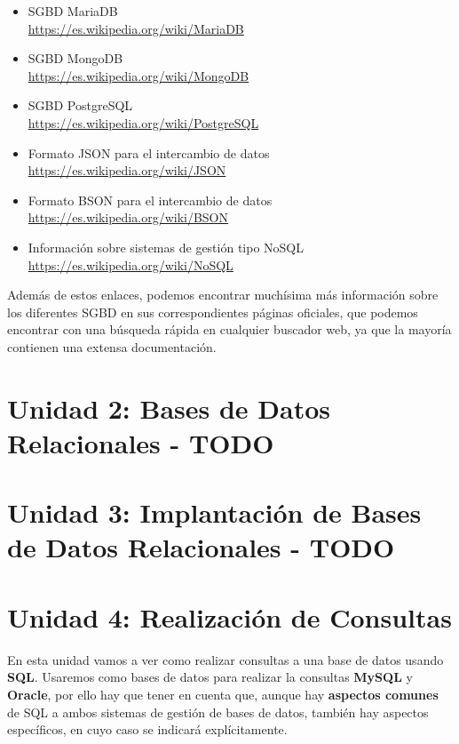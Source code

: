  \begin{itemize}
     \item SGBD MariaDB
     \\\url{https://es.wikipedia.org/wiki/MariaDB}

     \item SGBD MongoDB
     \\\url{https://es.wikipedia.org/wiki/MongoDB}

     \item SGBD PostgreSQL
     \\\url{https://es.wikipedia.org/wiki/PostgreSQL}

     \item Formato JSON para el intercambio de datos
     \\\url{https://es.wikipedia.org/wiki/JSON}

     \item Formato BSON para el intercambio de datos
     \\\url{https://es.wikipedia.org/wiki/BSON}

     \item Información sobre sistemas de gestión tipo NoSQL
     \\\url{https://es.wikipedia.org/wiki/NoSQL}
 \end{itemize}

Además de estos enlaces, podemos encontrar muchísima más información sobre los diferentes SGBD en sus correspondientes páginas oficiales, que podemos encontrar con una búsqueda rápida en cualquier buscador web, ya que la mayoría contienen una extensa documentación.

\chapter{Unidad 2: Bases de Datos Relacionales - TODO}
\chapter{Unidad 3: Implantación de Bases de Datos Relacionales - TODO}

\chapter{Unidad 4: Realización de Consultas}
En esta unidad vamos a ver como realizar consultas a una base de datos usando \textbf{SQL}. Usaremos como bases de datos para realizar la consultas \textbf{MySQL} y \textbf{Oracle}, por ello hay que tener en cuenta que, aunque hay \textbf{aspectos comunes} de SQL a ambos sistemas de gestión de bases de datos, también hay aspectos específicos, en cuyo caso se indicará explícitamente.

